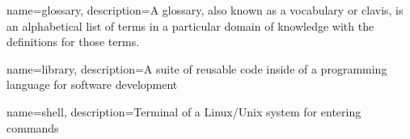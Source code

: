 {
    name={glossary},
    description={A glossary, also known as a vocabulary or clavis, is an alphabetical list of terms in a particular domain of knowledge with the definitions for those terms.}
}


{
    name={library},
    description={A suite of reusable code inside of a programming language for software development}
}


{
    name={shell},
    description={Terminal of a Linux/Unix system for entering commands}
}



\glsaddall
